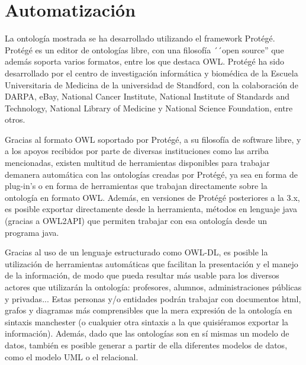 \chapter{Automatización}


La ontología mostrada se ha desarrollado utilizando el framework Protégé\cite{Stanford-Protégé:WEB}. Protégé es un editor de ontologías libre, con una filosofía ´´open source'' que además soporta varios formatos, entre los que destaca OWL\cite{W3C-OWL:WEB}. Protégé ha sido desarrollado por el centro de investigación informática y biomédica\cite{Stanford-BMIR:WEB} de la Escuela Universitaria de Medicina de la universidad de  Standford\cite{Stanford-MED:WEB}, con la colaboración de DARPA, eBay, National Cancer Institute, National Institute of Standards and Technology, National Library of Medicine y National Science Foundation, entre otros.

Gracias al formato OWL soportado por Protégé, a su filosofía de software libre, y a los apoyos recibidos por parte de diversas instituciones como las arriba mencionadas, existen multitud de herramientas disponibles para trabajar demanera automática con las ontologías creadas por Protégé, ya sea en forma de plug-in's o en forma de herramientas que trabajan directamente sobre la ontología en formato OWL. Además, en versiones de Protégé posteriores a la 3.x, es posible exportar directamente desde la herramienta, métodos en lenguaje java (gracias a OWL2API) que permiten trabajar con esa ontología desde un programa java.

Gracias al uso de un lenguaje estructurado como OWL-DL, es posible la utilización de herramientas automáticas que facilitan la presentación y el manejo de la información, de modo que pueda resultar más usable para los diversos actores que utilizarán la ontología: profesores, alumnos, administraciones públicas y privadas... Estas personas y/o entidades podrán trabajar con documentos html, grafos y diagramas más comprensibles que la mera expresión de la ontología en sintaxis manchester (o cualquier otra sintaxis a la que quisiéramos exportar la información). Además, dado que las ontologías son en sí mismas un modelo de datos, también es posible generar a partir de ella diferentes modelos de datos, como el modelo UML o el relacional.

